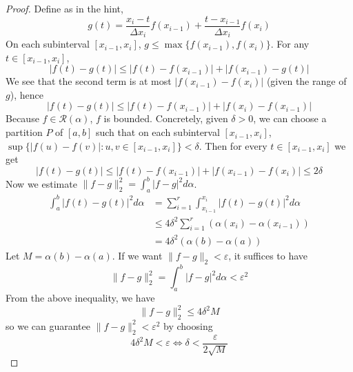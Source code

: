 \documentclass[11pt]{article}
\let\eps\varepsilon
\begin{document}
\begin{exercise}{6.12}
    \begin{proof}
        Define as in the hint, $$g(t) = \frac{x_i - t}{\Delta x_i} f(x_{i -1}) + \frac{t - x_{i - 1}}{\Delta x_i} f(x_i)$$ On each subinterval $[x_{i - 1}, x_i]$, $g \le \max \{ f(x_{i - 1}), f(x_i) \}$.  For any $t \in [x_{i - 1}, x_i]$, $$|f(t) - g(t)| \le |f(t) - f(x_{i - 1})| + |f(x_{i - 1}) - g(t)|$$ We see that the second term is at most $|f(x_{i - 1}) - f(x_i)|$ (given the range of $g$), hence $$|f(t) - g(t)| \le |f(t) - f(x_{i - 1})| + |f(x_i) - f(x_{i - 1})|$$ Because $f \in \mathcal{R}(\alpha)$, $f$ is bounded. Concretely, given $\delta > 0$, we can choose a partition $P$ of $[a, b]$ such that on each subinterval $[x_{i - 1}, x_i]$, $\sup\{ |f(u) - f(v)|: u, v \in [x_{i - 1}, x_i] \} < \delta$. Then for every $t \in [x_{i - 1}, x_i]$ we get $$|f(t) - g(t)| \le |f(t) - f(x_{i - 1})| + |f(x_{i - 1}) - f(x_i)| \le 2 \delta$$ Now we estimate $\| f - g \|_2^2 = \int_a^b |f - g|^2 d \alpha$. \begin{equation*}
            \begin{split}
                \int_a^b |f(t) - g(t)|^2 d \alpha & = \sum_{i = 1}^r \int_{x_{i - 1}}^{x_i} |f(t) - g(t)|^2 d \alpha \\
                & \le 4 \delta^2  \sum_{i = 1}^r (\alpha(x_i) - \alpha(x_{i - 1})) \\
                & = 4 \delta^2 (\alpha(b) - \alpha(a))
            \end{split}
        \end{equation*}
        Let $M = \alpha(b) - \alpha(a)$. If we want $\| f - g\|_2 < \eps$, it suffices to have $$\| f - g \|_2^2 = \int_a^b |f - g|^2 d \alpha < \eps^2$$ From the above inequality, we have $$\| f - g\|_2^2 \le 4 \delta^2 M$$ so we can guarantee $\| f - g\|_2^2 < \eps^2$ by choosing $$4\delta^2 M < \eps \iff \delta <\frac{\eps}{2 \sqrt{M}}$$
    \end{proof}
\end{exercise}
\end{document}
